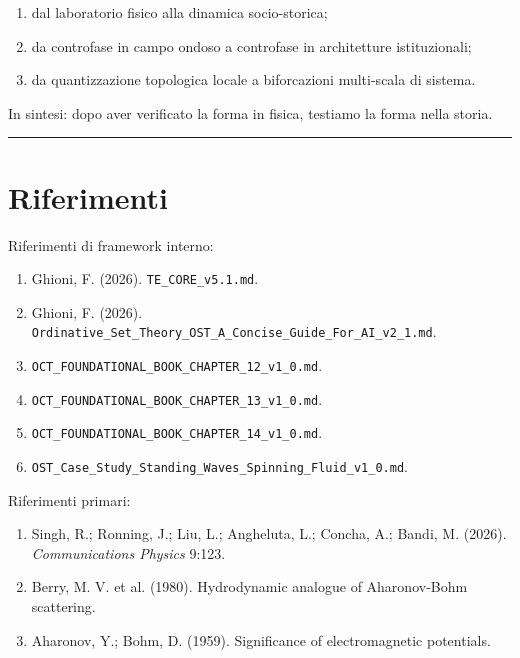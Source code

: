 \begin{enumerate}
\def\labelenumi{\arabic{enumi}.}
\tightlist
\item
  dal laboratorio fisico alla dinamica socio-storica;
\item
  da controfase in campo ondoso a controfase in architetture istituzionali;
\item
  da quantizzazione topologica locale a biforcazioni multi-scala di sistema.
\end{enumerate}

In sintesi: dopo aver verificato la forma in fisica, testiamo la forma nella storia.

\begin{center}\rule{0.5\linewidth}{0.5pt}\end{center}

\section{Riferimenti}

Riferimenti di framework interno:

\begin{enumerate}
\def\labelenumi{\arabic{enumi}.}
\tightlist
\item
  Ghioni, F. (2026). \texttt{TE\_CORE\_v5.1.md}.
\item
  Ghioni, F. (2026). \texttt{Ordinative\_Set\_Theory\_OST\_A\_Concise\_Guide\_For\_AI\_v2\_1.md}.
\item
  \texttt{OCT\_FOUNDATIONAL\_BOOK\_CHAPTER\_12\_v1\_0.md}.
\item
  \texttt{OCT\_FOUNDATIONAL\_BOOK\_CHAPTER\_13\_v1\_0.md}.
\item
  \texttt{OCT\_FOUNDATIONAL\_BOOK\_CHAPTER\_14\_v1\_0.md}.
\item
  \texttt{OST\_Case\_Study\_Standing\_Waves\_Spinning\_Fluid\_v1\_0.md}.
\end{enumerate}

Riferimenti primari:

\begin{enumerate}
\def\labelenumi{\arabic{enumi}.}
\tightlist
\item
  Singh, R.; Ronning, J.; Liu, L.; Angheluta, L.; Concha, A.; Bandi, M. (2026). \emph{Communications Physics} 9:123.
\item
  Berry, M. V. et al. (1980). Hydrodynamic analogue of Aharonov-Bohm scattering.
\item
  Aharonov, Y.; Bohm, D. (1959). Significance of electromagnetic potentials.
\end{enumerate}
